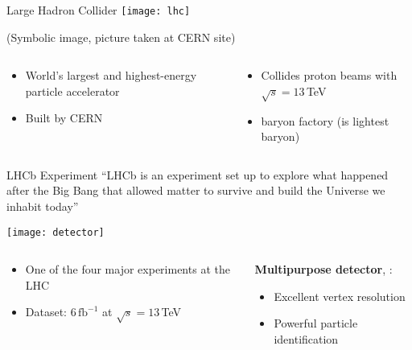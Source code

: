 \begin{frame}{Large Hadron Collider}
    \centering
    \texttt{[image: lhc]}\\
    \vspace{-2mm}
    \begin{center}
        \footnotesize (Symbolic image, picture taken at CERN site)
    \end{center}

    \begin{columns}[T]
        \begin{column}{.45\textwidth}
            \begin{itemize}
                \item World's largest and highest-energy particle accelerator 
                \item Built by CERN
            \end{itemize}
        \end{column}
        \begin{column}{.55\textwidth}
            \begin{itemize}
                \item Collides proton beams with $\sqrt{s}=13\,$TeV
                \item \bquark baryon factory (\Lb is lightest \bquark baryon)
            \end{itemize}
        \end{column}
    \end{columns}
\end{frame}

\begin{frame}{LHCb Experiment}
    \centering
    \enquote{LHCb is an experiment set up to explore what happened after the Big Bang that allowed matter to survive and build the Universe we inhabit today}

    \texttt{[image: detector]}
    \begin{columns}[T]
        \begin{column}{.5\textwidth}
            \begin{itemize}
                \item One of the four major experiments at the LHC
                \item Dataset: $6\,\text{fb}^{-1}$ at $\sqrt{s}=13\,$TeV
            \end{itemize}
        \end{column}
        \begin{column}{.5\textwidth}
            \textbf{Multipurpose detector}, \eg{}:
            \begin{itemize}
                \item Excellent vertex resolution
                \item Powerful particle identification
            \end{itemize}
        \end{column}
    \end{columns}
\end{frame}

